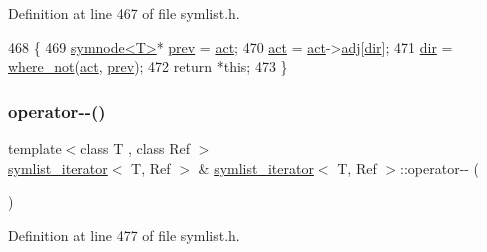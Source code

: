 Definition at line 467 of file symlist.\+h.


\begin{DoxyCode}
468 \{
469     \mbox{\hyperlink{structsymnode}{symnode<T>}}* \mbox{\hyperlink{structsymlist__iterator_a30f1c0a962713ded0c24871093089fb0}{prev}} = \mbox{\hyperlink{structsymlist__iterator_a1c7a0193ab85baa7705070975d841fc8}{act}}; 
470     \mbox{\hyperlink{structsymlist__iterator_a1c7a0193ab85baa7705070975d841fc8}{act}} = \mbox{\hyperlink{structsymlist__iterator_a1c7a0193ab85baa7705070975d841fc8}{act}}->\mbox{\hyperlink{structsymnode_aba7e8f525fb4d85417384a6ccff59241}{adj}}[\mbox{\hyperlink{structsymlist__iterator_a8433e558ceb6b17b225414ef46b4a3e2}{dir}}];
471     \mbox{\hyperlink{structsymlist__iterator_a8433e558ceb6b17b225414ef46b4a3e2}{dir}} = \mbox{\hyperlink{structsymlist__iterator_abeee238d3bfff557cdbf08a05b632fa8}{where\_not}}(\mbox{\hyperlink{structsymlist__iterator_a1c7a0193ab85baa7705070975d841fc8}{act}}, \mbox{\hyperlink{structsymlist__iterator_a30f1c0a962713ded0c24871093089fb0}{prev}});
472     \textcolor{keywordflow}{return} *\textcolor{keyword}{this};
473 \}
\end{DoxyCode}
\mbox{\label{structsymlist__iterator_a510c633d2c7d830afa57acfa36434e52}} 
\subsubsection{\texorpdfstring{operator-\/-\/()}{operator--()}}
{\footnotesize\ttfamily template$<$class T , class Ref $>$ \\
\mbox{\hyperlink{structsymlist__iterator}{symlist\+\_\+iterator}}$<$ T, Ref $>$ \& \mbox{\hyperlink{structsymlist__iterator}{symlist\+\_\+iterator}}$<$ T, Ref $>$\+::operator-\/-\/ (\begin{DoxyParamCaption}{ }\end{DoxyParamCaption})}



Definition at line 477 of file symlist.\+h.


